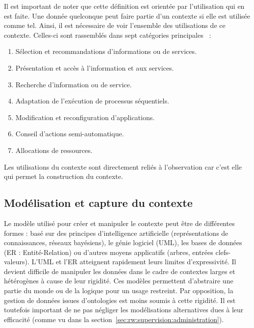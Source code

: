 Il est important de noter que cette définition est orientée par l'utilisation qui en est faite. Une donnée quelconque peut faire partie d'un contexte si elle est utilisée comme tel. Ainsi, il est nécessaire de voir l'ensemble des utilisations de ce contexte. Celles-ci sont rassemblés dans sept catégories principales~\cite{Soylu:context} : 
\begin{enumerate}
	\item Sélection et recommandations d'informations ou de services.
	\item Présentation et accès à l'information et aux services.
	\item Recherche d'information ou de service.
	\item Adaptation de l'exécution de processus séquentiels.
	\item Modification et reconfiguration d'applications.
	\item Conseil d'actions semi-automatique.
	\item Allocations de ressources.
\end{enumerate}
Les utilisations du contexte sont directement reliés à l'observation car c'est elle qui permet la construction du contexte.

\subsection{Modélisation et capture du contexte}
Le modèle utilisé pour créer et manipuler le contexte peut être de différentes formes : basé sur des principes d'intelligence artificielle (représentations de connaissances, réseaux bayésiens), le génie logiciel (UML), les bases de données (ER : Entité-Relation) ou d'autres moyens applicatifs (arbres, entrées clefs-valeurs). L'UML et l'ER atteignent rapidement leurs limites d'expressivité. Il devient difficile de manipuler les données dans le cadre de contextes larges et hétérogènes à cause de leur rigidité. Ces modèles permettent d'abstraire une partie du monde ou de la logique pour un usage restreint. Par opposition, la gestion de données issues d'ontologies est moins soumis à cette rigidité. Il est toutefois important de ne pas négliger les modélisations alternatives dues à leur efficacité (comme vu dans la section~\ref{sec:rw:supervision:administration}).

